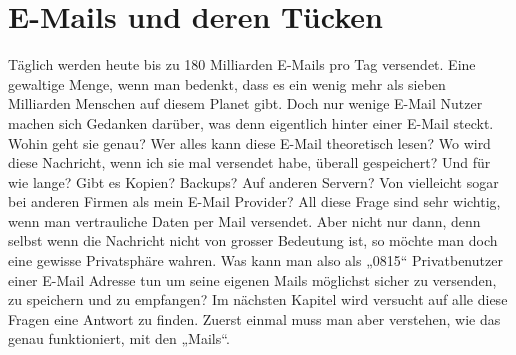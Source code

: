 \newpage
\section{E-Mails und deren Tücken}
Täglich werden heute bis zu 180 Milliarden E-Mails pro Tag versendet. Eine gewaltige Menge, wenn man bedenkt, dass es ein wenig mehr als sieben Milliarden Menschen auf diesem Planet gibt.
Doch nur wenige E-Mail Nutzer machen sich Gedanken darüber, was denn eigentlich hinter einer E-Mail steckt. Wohin geht sie genau? Wer alles kann diese E-Mail theoretisch lesen? Wo wird diese Nachricht, wenn ich sie mal versendet habe, überall gespeichert? Und für wie lange? Gibt es Kopien? Backups? Auf anderen Servern? Von vielleicht sogar bei anderen Firmen als mein E-Mail Provider?
All diese Frage sind sehr wichtig, wenn man vertrauliche Daten per Mail versendet. Aber nicht nur dann, denn selbst wenn die Nachricht nicht von grosser Bedeutung ist, so möchte man doch eine gewisse Privatsphäre wahren.
Was kann man also als „0815“ Privatbenutzer einer E-Mail Adresse tun um seine eigenen Mails möglichst sicher zu versenden, zu speichern und  zu empfangen?
Im nächsten Kapitel wird versucht auf alle diese Fragen eine Antwort zu finden. Zuerst einmal muss man aber verstehen, wie das genau funktioniert, mit den „Mails“.


